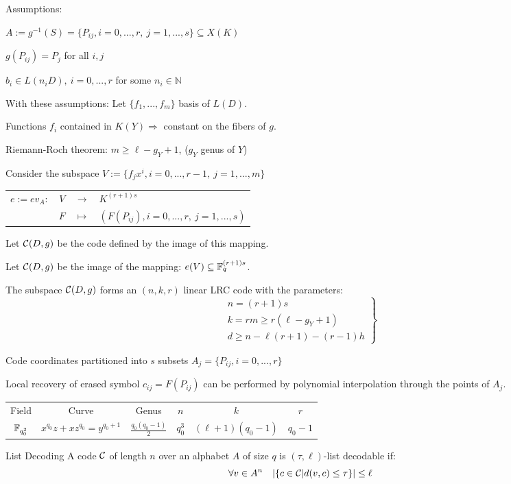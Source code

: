 \begin{frame}
Assumptions:

$A := g^{-1}(S) = \{P_{ij}, i=0,...,r, \ j=1,...,s\} \subseteq X(K)$

$g(P_{ij}) = P_j$ for all $i,j$

$b_i \in L(n_i D), \ i=0,...,r$ for some $n_i \in \mathbb{N}$

With these assumptions:
Let $\{ f_1, ..., f_m \}$ basis of $L(D)$.

Functions $f_i$ contained in $K(Y) \Rightarrow$ constant on the fibers of $g$.

Riemann-Roch theorem: $m \geq \ell - g_Y +1$, ($g_Y$ genus of $Y$)

Consider the subspace $V:=\{f_j x^i, i=0,...,r-1, \ j=1,...,m\}$

\begin{tabular}{rccl}
$e := ev_A:$ & $V$ & $\rightarrow$ & $K^{(r+1)s}$ \\
            & $F$ & $\mapsto$ & $(F(P_{ij}), i=0,...,r, \ j=1,...,s)$
\end{tabular}

Let $\mathcal{C}(D,g)$ be the code defined by the image of this mapping.

\end{frame}

\begin{frame}
    Let $\mathcal{C}(D,g)$ be the image of the mapping: $e(V) \subseteq \mathbb{F}_q^{(r+1)s}$.
    \begin{theorem}
        The subspace $\mathcal{C}(D,g)$ forms an $(n,k,r)$ linear LRC code with the parameters:
        $$        
        \left.                
        \begin{matrix}
        n = (r+1)s \\
        k = rm \geq r(\ell - g_Y + 1) \\
        d \geq n - \ell ( r+1) - (r-1)h
        \end{matrix}                
        \right\rbrace
        $$
    \end{theorem}
    Code coordinates partitioned into $s$ subsets $A_j = \{P_{ij}, i = 0, ..., r\}$
    
    Local recovery of erased symbol $c_{ij} = F(P_{ij})$ can be performed by polynomial interpolation through the points of $A_j$.
\end{frame}

\begin{frame}
    \begin{tabular}{cccccc}
        Field    &    Curve    &    Genus    &    $n$    &    $k$    &    $r$    \\
        $\mathbb{F}_{q_0^2}$ & $x^{q_0}z + x z^{q_0} = y^{q_0+1}$ & $\frac{q_0 (q_0 -1)}{2}$ & $q_0^3$ & $(\ell +1)(q_0 - 1)$ & $q_0 -1$
    \end{tabular}
\end{frame}

\begin{frame}{List Decoding}
A code $\mathcal{C}$ of length $n$ over an alphabet $A$ of size $q$ is $(\tau, \ell)$-list decodable if:
$$\forall v \in A^n \quad \vert \{ c \in \mathcal{C} \vert d(v,c) \leq \tau \} \vert \leq \ell $$
\end{frame}